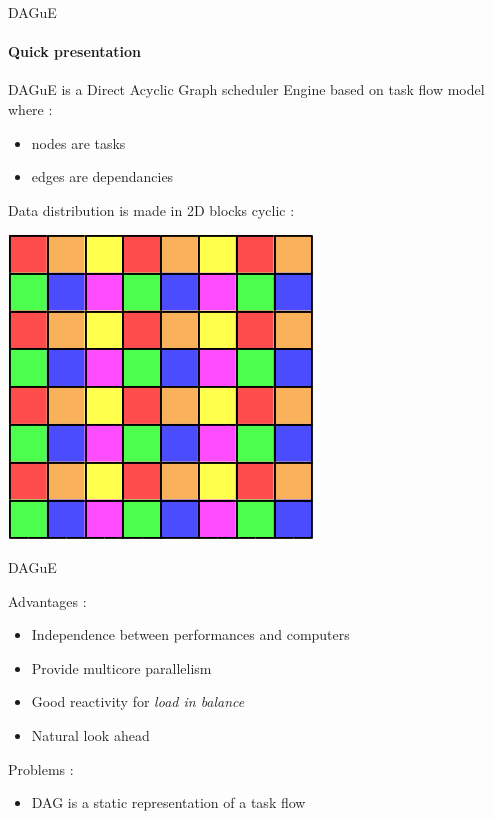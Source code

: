 \begin{frame}{DAGuE}
\framesubtitle{Quick presentation}
DAGuE is a Direct Acyclic Graph scheduler Engine based on task flow model where :
\begin{itemize}
\item nodes are tasks
\item edges are dependancies
\end{itemize}
Data distribution is made in 2D blocks cyclic :
\begin{center}
\includegraphics[scale=0.5]{scalapack.png}
\end{center}
\end{frame}

\begin{frame}{DAGuE}
\begin{exampleblock}{Advantages :}
\begin{itemize}
\item Independence between performances and computers
\item Provide multicore parallelism
\item Good reactivity for \textit{load in balance}
\item Natural look ahead
\end{itemize}
\end{exampleblock}{}
\pause
\begin{exampleblock}{Problems :}
\begin{itemize}
\item DAG is a static representation of a task flow
\end{itemize}
\end{exampleblock}{}
\end{frame}

